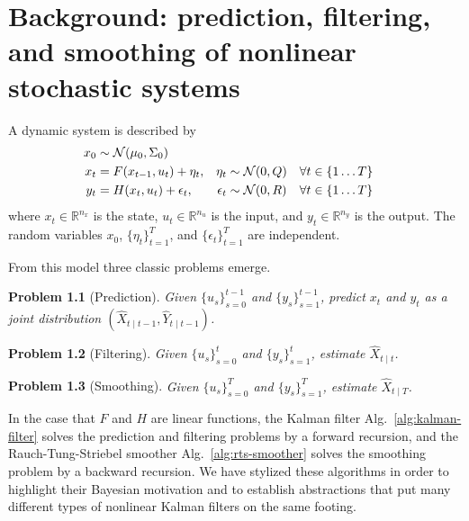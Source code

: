 \documentclass[oneside, article]{memoir}
\newtheorem{problem}{Problem}
\begin{document}
\chapter{Background: prediction, filtering, and smoothing of
nonlinear stochastic systems}
A dynamic system is described by
\begin{subequations}
  \label{eq:dynamic-system}
  \begin{align}
    x_0 &\sim \mathcal{N}(\mu_0, \Sigma_0) \\
    x_t &= F(x_{t-1}, u_t) + \eta_t, &\eta_t &\sim \mathcal{N}(0, Q)
    & \forall t &\in \cbr{1 \ldots T}\\
    y_t &= H(x_t, u_t) + \epsilon_t, &\epsilon_t &\sim \mathcal{N}(0,
    R) & \forall t &\in \cbr{1 \ldots T}
  \end{align}
\end{subequations}
where \(x_t \in \mathbb{R}^{n_x}\) is the state, \(u_t \in \mathbb
R^{n_u}\) is the input, and \(y_t \in \mathbb{R}^{n_y}\) is the output.
The random variables \(x_0\), \(\{\eta_t\}_{t=1}^T\), and
\(\{\epsilon_t\}_{t=1}^T\) are independent.

From this model three classic problems emerge.
\begin{problem}[Prediction]\label{problem:prediction}
  Given \(\{u_s\}_{s=0}^{t-1}\) and \(\{y_s\}_{s=1}^{t-1}\), predict
  \(x_t\) and \(y_t\) as a joint distribution \((\hat X_{t \mid t-1},
  \hat Y_{t \mid t-1})\).
\end{problem}

\begin{problem}[Filtering]\label{problem:filtering}
  Given \(\{u_s\}_{s=0}^{t}\) and \(\{y_s\}_{s=1}^t\), estimate
  \(\hat X_{t \mid t}\).
\end{problem}

\begin{problem}[Smoothing]\label{problem:smoothing}
  Given \(\{u_s\}_{s=0}^T\) and \(\{y_s\}_{s=1}^T\), estimate \(\hat X_{t \mid T}\).
\end{problem}
In the case that \(F\) and \(H\) are linear functions,
the Kalman filter Alg.~\ref{alg:kalman-filter} solves the prediction
and filtering problems by a forward recursion, and the
Rauch-Tung-Striebel smoother Alg.~\ref{alg:rts-smoother} solves the
smoothing problem by a backward recursion.
We have stylized these algorithms in order to highlight their
Bayesian motivation and to establish abstractions that put many
different types of nonlinear Kalman filters on the same footing.
\end{document}

